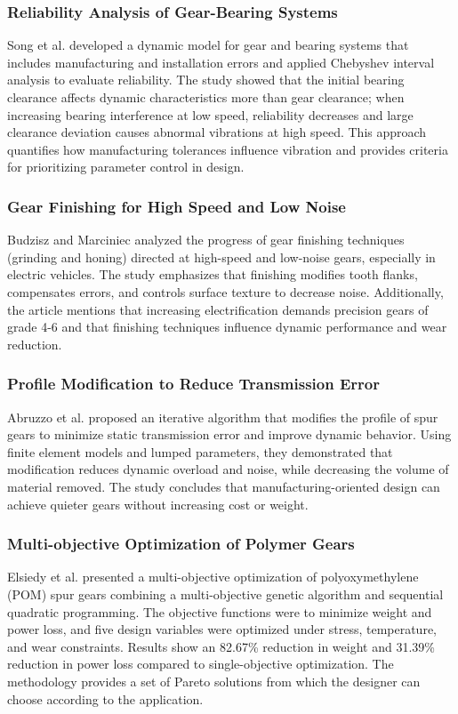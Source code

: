 \documentclass{article}
\begin{document}
\subsubsection*{Reliability Analysis of Gear-Bearing Systems}
Song et al. \cite{song2025reliability} developed a dynamic model for gear and bearing systems that includes manufacturing and installation errors and applied Chebyshev interval analysis to evaluate reliability.
The study showed that the initial bearing clearance affects dynamic characteristics more than gear clearance; when increasing bearing interference at low speed, reliability decreases and large clearance deviation causes abnormal vibrations at high speed.
This approach quantifies how manufacturing tolerances influence vibration and provides criteria for prioritizing parameter control in design.

\subsubsection*{Gear Finishing for High Speed and Low Noise}
Budzisz and Marciniec \cite{budzisz2022finishing} analyzed the progress of gear finishing techniques (grinding and honing) directed at high-speed and low-noise gears, especially in electric vehicles.
The study emphasizes that finishing modifies tooth flanks, compensates errors, and controls surface texture to decrease noise.
Additionally, the article mentions that increasing electrification demands precision gears of grade 4-6 and that finishing techniques influence dynamic performance and wear reduction.

\subsubsection*{Profile Modification to Reduce Transmission Error}
Abruzzo et al. \cite{abruzzo2023profile} proposed an iterative algorithm that modifies the profile of spur gears to minimize static transmission error and improve dynamic behavior.
Using finite element models and lumped parameters, they demonstrated that modification reduces dynamic overload and noise, while decreasing the volume of material removed.
The study concludes that manufacturing-oriented design can achieve quieter gears without increasing cost or weight.

\subsubsection*{Multi-objective Optimization of Polymer Gears}
Elsiedy et al. \cite{elsiedy2024multi} presented a multi-objective optimization of polyoxymethylene (POM) spur gears combining a multi-objective genetic algorithm and sequential quadratic programming.
The objective functions were to minimize weight and power loss, and five design variables were optimized under stress, temperature, and wear constraints.
Results show an 82.67\% reduction in weight and 31.39\% reduction in power loss compared to single-objective optimization.
The methodology provides a set of Pareto solutions from which the designer can choose according to the application.
\end{document}
